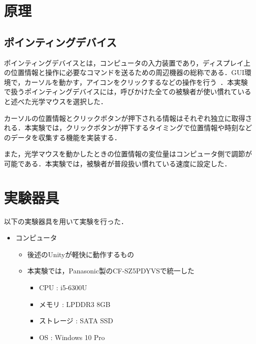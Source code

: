 \documentclass[a4paper, papersize, titlepage]{jsarticle}
\begin{document}
\begin{multicols}{2}



\section{原理}
\subsection{ポインティングデバイス}
ポインティングデバイスとは，コンピュータの入力装置であり，ディスプレイ上の位置情報と操作に必要なコマンドを送るための周辺機器の総称である．GUI環境で，カーソルを動かす，アイコンをクリックするなどの操作を行う~\cite{pointing_device_bib}．本実験で扱うポインティングデバイスには，呼びかけた全ての被験者が使い慣れていると述べた光学マウスを選択した．

カーソルの位置情報とクリックボタンが押下される情報はそれぞれ独立に取得される．本実験では，クリックボタンが押下するタイミングで位置情報や時刻などのデータを収集する機能を実装する．

また，光学マウスを動かしたときの位置情報の変位量はコンピュータ側で調節が可能である．本実験では，被験者が普段扱い慣れている速度に設定した．


\section{実験器具}

以下の実験器具を用いて実験を行った．

\begin{itemize}
\item コンピュータ
\begin{itemize}
\item 後述のUnityが軽快に動作するもの
\item 本実験では，Panasonic製のCF-SZ5PDYVSで統一した
\begin{itemize}
\item CPU : i5-6300U
\item メモリ : LPDDR3 8GB
\item ストレージ : SATA SSD
\item OS : Windows 10 Pro
\end{itemize}
\end{itemize}


\end{itemize}
\end{multicols}
\end{document}
